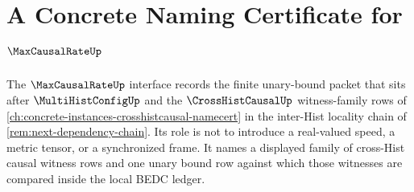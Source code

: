 \chapter{A Concrete Naming Certificate for $\MaxCausalRateUp$}
\label{ch:concrete-instances-maxcausalrate-namecert}


The $\MaxCausalRateUp$ interface records the finite unary-bound packet that sits after $\MultiHistConfigUp$ and the $\CrossHistCausalUp$ witness-family rows of \autoref{ch:concrete-instances-crosshistcausal-namecert} in the inter-Hist locality chain of \autoref{rem:next-dependency-chain}. Its role is not to introduce a real-valued speed, a metric tensor, or a synchronized frame. It names a displayed family of cross-Hist causal witness rows and one unary bound row against which those witnesses are compared inside the local BEDC ledger.

